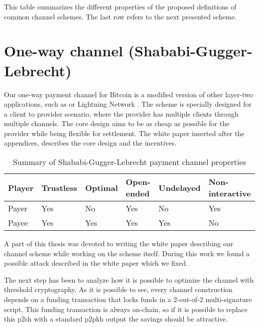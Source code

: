 \documentclass{llncs}
\begin{document}
This table summarizes the different properties of the proposed definitions of common channel schemes. The last row refers to the next presented scheme.

\section{One-way channel (Shababi-Gugger-Lebrecht)}

Our one-way payment channel for Bitcoin is a modified version of other layer-two applications, such as  or Lightning Network \cite{poon2016bitcoin, YoursLightningProtocol}. The scheme is specially designed for a client to provider scenario, where the provider has multiple clients through multiple channels. The core design aims to be as cheap as possible for the provider while being flexible for settlement. The white paper  inserted after the appendices, describes the core design and the incentives.

\begin{table}[h]
  \begin{tabularx}{\textwidth}{ | X | l | l | l | l | l |}
  \hline
  Player & Trustless & Optimal & Open-ended & Undelayed & Non-interactive \\
  \hline \hline
  Payer & Yes & No & Yes & No & Yes \\ \hline
  Payee & Yes & Yes & Yes & Yes & No \\
  \hline
  \end{tabularx}
  \caption{Summary of Shababi-Gugger-Lebrecht payment channel properties}
  \label{fig:summaryShababiGuggerLebrechtPaymentChannel}
\end{table}

A part of this thesis was devoted to writing the white paper describing our channel scheme while working on the scheme itself. During this work we found a possible attack described in the white paper which we fixed.

The next step has been to analyze how it is possible to optimize the channel with threshold cryptography. As it is possible to see, every channel construction depends on a funding transaction that locks funds in a 2-out-of-2 multi-signature script. This funding transaction is always on-chain, so if it is possible to replace this \gls{p2sh} with a standard \gls{p2pkh} output the savings should be attractive.

%
%
\printbibliography

%
%
\printglossaries
\end{document}

